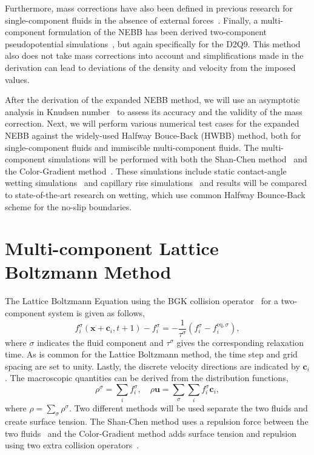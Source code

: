 \documentclass[aps,physrev,twocolumn,10pt]{revtex4-2}
\begin{document}
Furthermore, mass corrections have also been defined in previous research for single-component fluids in the absence of external forces~\cite{klass_non-equilibrium_2021}. Finally, a multi-component formulation of the NEBB has been derived two-component pseudopotential simulations~\cite{wang_two_2022}, but again specifically for the D2Q9. This method also does not take mass corrections into account and simplifications made in the derivation can lead to deviations of the density and velocity from the imposed values. 

After the derivation of the expanded NEBB method, we will use an asymptotic analysis in Knudsen number~\cite{junk_asymptotic_2005} to assess its accuracy and the validity of the mass correction. Next, we will perform various numerical test cases for the expanded NEBB against the widely-used Halfway Bouce-Back (HWBB) method, both for single-component fluids and immiscible multi-component fluids.  The multi-component simulations will be performed with both the Shan-Chen method~\cite{shan_lattice_1993} and the Color-Gradient method~\cite{leclaire_generalized_2017}. These simulations include static contact-angle wetting simulations~\cite{yu_color-gradient_2018} and capillary rise simulations~\cite{chibbaro_capillary_2009}\cite{akai_wetting_2018} and results will be compared to state-of-the-art research on wetting, which use common Halfway Bounce-Back scheme for the no-slip boundaries. 

\section{\label{sec:}Multi-component Lattice Boltzmann Method}
The Lattice Boltzmann Equation using the BGK collision operator~\cite{bhatnagar_model_1954} for a two-component system is given as follows,
\begin{equation}\label{eq:Lattice Boltzmann Equation Two-component BGK}
    f_i^{\sigma}(\bm{x} + \bm{c}_i, t + 1) - f_i^{\sigma} =  -\frac{1}{\tau^\sigma}\left(f_i^{\sigma} - f_i^{\text{eq}, \sigma}\right),
\end{equation}
where $\sigma$ indicates the fluid component and $\tau^\sigma$ gives the corresponding relaxation time. As is common for the Lattice Boltzmann method, the time step and grid spacing are set to unity. Lastly, the discrete velocity directions are indicated by $\bm{c}_i$. The macroscopic quantities can be derived from the distribution functions,
\begin{equation}\label{eq:Macroscopic quantities}
    \rho^\sigma = \sum_i f_i^\sigma,\quad \rho \bm{u} = \sum_\sigma\sum_i f_i^\sigma \bm{c}_i,
\end{equation}
where $\rho = \sum_\sigma \rho^\sigma$. Two different methods will be used separate the two fluids and create surface tension. The Shan-Chen method uses a repulsion force between the two fluids~\cite{shan_lattice_1993} and the Color-Gradient method adds surface tension and repulsion using two extra collision operators~\cite{leclaire_generalized_2017}.
\end{document}
